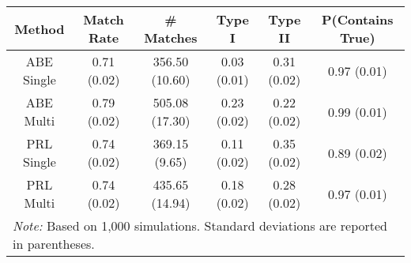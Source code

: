 
\begin{tabular}{cccccc}
\toprule
Method & Match Rate & \# Matches & Type I & Type II & P(Contains True)\\
\midrule
ABE Single & 0.71 (0.02) & 356.50 (10.60) & 0.03 (0.01) & 0.31 (0.02) & 0.97 (0.01)\\
ABE Multi & 0.79 (0.02) & 505.08 (17.30) & 0.23 (0.02) & 0.22 (0.02) & 0.99 (0.01)\\
PRL Single & 0.74 (0.02) & 369.15 (9.65) & 0.11 (0.02) & 0.35 (0.02) & 0.89 (0.02)\\
PRL Multi & 0.74 (0.02) & 435.65 (14.94) & 0.18 (0.02) & 0.28 (0.02) & 0.97 (0.01)\\
\bottomrule
\multicolumn{6}{l}{\textit{Note: } Based on 1,000 simulations. Standard deviations are reported in parentheses.}\\
\end{tabular}
